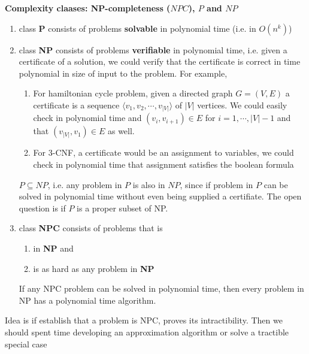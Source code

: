\documentclass[11pt]{article}
\begin{document}
\begin{defn*}
    \textbf{Complexity claases: NP-completeness ($NPC$), $P$ and $NP$}
    \begin{enumerate}
        \item class \textbf{P} consists of problems \textbf{solvable} in polynomial time (i.e. in $O(n^k)$)
        \item class \textbf{NP} consists of problems \textbf{verifiable} in polynomial time, i.e. given a certificate of a solution, we could verify that the certificate is correct in time polynomial in size of input to the problem. For example, 
        \begin{enumerate}
            \item For hamiltonian cycle problem, given a directed graph $G = (V,E)$ a certificate is a sequence $\langle v_1,v_2, \cdots, v_{|V|} \rangle$ of $|V|$ vertices. We could easily check in polynomial time and $(v_i, v_{i+1})\in E$ for $i = 1,\cdots, |V|-1$ and that $(v_{|V|}, v_1) \in E$ as well. 
            \item For 3-CNF, a certificate would be an assignment to variables, we could check in polynomial time that assignment satisfies the boolean formula
        \end{enumerate}
        $P\subseteq NP$, i.e. any problem in $P$ is also in $NP$, since if problem in $P$ can be solved in polynomial time without even being supplied a certifiate. The open question is if $P$ is a proper subset of NP.
        \item  class \textbf{NPC} consists of problems that is 
        \begin{enumerate}
            \item in \textbf{NP} and 
            \item is as hard as any problem in \textbf{NP}
        \end{enumerate}
        If any NPC problem can be solved in polynomial time, then every problem in NP has a polynomial time algorithm.
    \end{enumerate}
    Idea is if establish that a problem is NPC, proves its intractibility. Then we should spent time developing an approximation algorithm or solve a tractible special case
\end{defn*}
\end{document}
